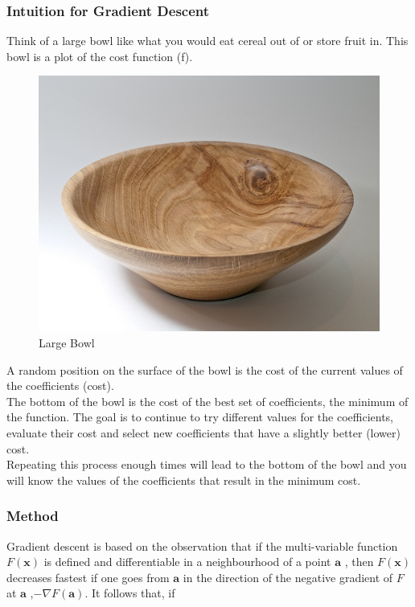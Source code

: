 \documentclass[11pt, a4paper]{report}
\begin{document}
\subsubsection{Intuition for Gradient Descent}
Think of a large bowl like what you would eat cereal out of or store fruit in. This bowl is a plot of the cost function (f).

	\begin{figure}[!bth]
	\center
	\includegraphics[scale=0.32]{images/Large-Bowl.jpg}
	\caption[Large Bowl]{Large Bowl \cite{fig:largeBowl}}
	\label{fig:largeBowl}
	\end{figure}

A random position on the surface of the bowl is the cost of the current values of the coefficients (cost). \\

The bottom of the bowl is the cost of the best set of coefficients, the minimum of the function.
The goal is to continue to try different values for the coefficients, evaluate their cost and select new coefficients that have a slightly better (lower) cost. \\

Repeating this process enough times will lead to the bottom of the bowl and you will know the values of the coefficients that result in the minimum cost. \cite{desc:GradientDescent}

\subsubsection{Method}


Gradient descent is based on the observation that if the multi-variable function
\(F(\mathbf {x} ) \) is defined and differentiable in a neighbourhood of a point \({\displaystyle \mathbf {a} } \) , 
then \( {\displaystyle F(\mathbf {x} )} \) decreases fastest if one goes from \({\displaystyle \mathbf {a} } \) in the direction of the negative gradient of \({\displaystyle F} \) at \( {\displaystyle \mathbf {a} }\) ,\( {\displaystyle -\nabla F(\mathbf {a} )} \). It follows that, if
\end{document}
